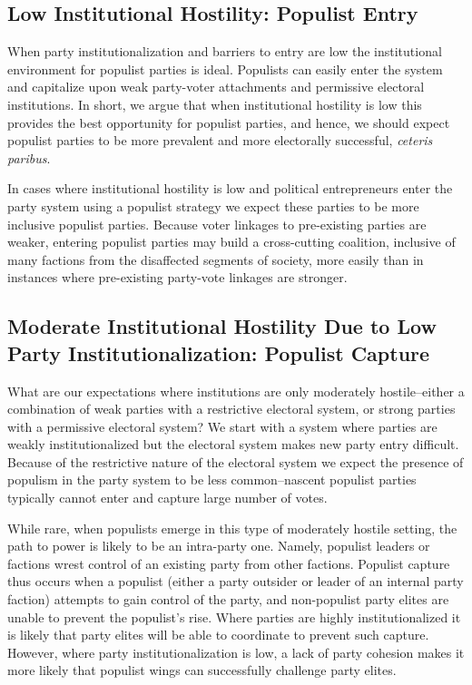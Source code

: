 \documentclass[a4paper,12pt]{article}\usepackage[]{graphicx}\usepackage[]{color}
\begin{document}
\subsection*{Low Institutional Hostility: Populist Entry}
When party institutionalization and barriers to entry are low the institutional environment for populist parties is ideal. Populists can easily enter the system and capitalize upon weak party-voter attachments and permissive electoral institutions. In short, we argue that when institutional hostility is low this provides the best opportunity for populist parties, and hence, we should expect populist parties to be more prevalent and more electorally successful, \textit{ceteris paribus}. 
\par
In cases where institutional hostility is low and political entrepreneurs enter the party system using a populist strategy we expect these parties to be more inclusive populist parties. Because voter linkages to pre-existing parties are weaker, entering populist parties may build a cross-cutting coalition, inclusive of many factions from the disaffected segments of society, more easily than in instances where pre-existing party-vote linkages are stronger. 
\par
\subsection*{Moderate Institutional Hostility Due to Low Party Institutionalization: Populist Capture }
What are our expectations where institutions are only moderately hostile--either a combination of weak parties with a restrictive electoral system, or strong parties with a permissive electoral system? We start with a system where parties are weakly institutionalized but the electoral system makes new party entry difficult. Because of the restrictive nature of the electoral system we expect the presence of populism in the party system to be less common--nascent populist parties typically cannot enter and capture large number of votes.   
\par
While rare, when populists emerge in this type of moderately hostile setting, the path to power is likely to be an intra-party one. Namely, populist leaders or factions wrest control of an existing party from other factions. Populist capture thus occurs when a populist (either a party outsider or leader of an internal party faction) attempts to gain control of the party, and non-populist party elites are unable to prevent the populist's rise. Where parties are highly institutionalized it is likely that party elites will be able to coordinate to prevent such capture. However, where party institutionalization is low, a lack of party cohesion makes it more likely that populist wings can successfully challenge party elites. 
\end{document}
